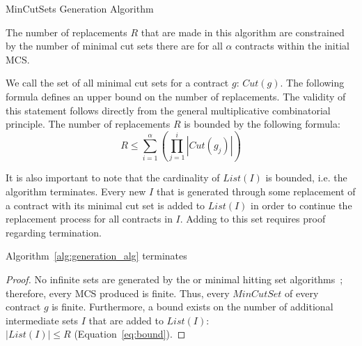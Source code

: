 \begin{algorithm}[h]

	\caption{MinCutSets Generation Algorithm}
	\label{alg:generation_alg}
\end{algorithm}

The number of replacements $R$ that are made in this algorithm are constrained by the number of minimal cut sets there are for all $\alpha$ contracts within the initial MCS. 

We call the set of all minimal cut sets for a contract $g$: $Cut(g)$. The following formula defines an upper bound on the number of replacements. The validity of this statement follows directly from the general multiplicative combinatorial principle. The number of replacements $R$ is bounded by the following formula:
\begin{equation}
\label{eq:bound}
  R \leq {\displaystyle \sum_{i=1}^{\alpha} }({\displaystyle \prod_{j=1}^{i} |Cut(g_j)|})  
\end{equation}


It is also important to note that the cardinality of $List(I)$ is bounded, i.e. the algorithm terminates. Every new $I$ that is generated through some replacement of a contract with its minimal cut set is added to $List(I)$ in order to continue the replacement process for all contracts in $I$. Adding to this set requires proof regarding termination.
\begin{theorem}
Algorithm~\ref{alg:generation_alg} terminates
\begin{proof}
No infinite sets are generated by the \aivcalg or minimal hitting set algorithms~\cite{Ghassabani2017EfficientGO,murakami2013efficient}; therefore, every MCS produced is finite. Thus, every $MinCutSet$ of every contract $g$ is finite. Furthermore, a bound exists on the number of additional intermediate sets $I$ that are added to $List(I)$: \\
$|List(I)| \leq R$ (Equation~\ref{eq:bound}).
\end{proof}
\end{theorem}

